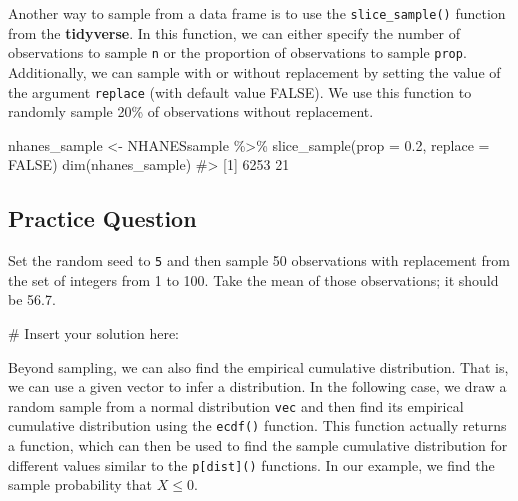 \documentclass[
  letterpaper,
]{latex/krantz}
\makeatletter
\newenvironment{Shaded}{\begin{snugshade}}{\end{snugshade}}
\newcommand{\AttributeTok}[1]{\textcolor[rgb]{0.40,0.45,0.13}{#1}}
\newcommand{\CommentTok}[1]{\textcolor[rgb]{0.37,0.37,0.37}{#1}}
\newcommand{\ConstantTok}[1]{\textcolor[rgb]{0.56,0.35,0.01}{#1}}
\newcommand{\FloatTok}[1]{\textcolor[rgb]{0.68,0.00,0.00}{#1}}
\newcommand{\FunctionTok}[1]{\textcolor[rgb]{0.28,0.35,0.67}{#1}}
\newcommand{\NormalTok}[1]{\textcolor[rgb]{0.00,0.23,0.31}{#1}}
\newcommand{\OtherTok}[1]{\textcolor[rgb]{0.00,0.23,0.31}{#1}}
\newcommand{\SpecialCharTok}[1]{\textcolor[rgb]{0.37,0.37,0.37}{#1}}
\newenvironment{kframe}{%
\medskip{}
\setlength{\fboxsep}{.8em}
 \def\at@end@of@kframe{}%
 \ifinner\ifhmode%
  \def\at@end@of@kframe{\end{minipage}}%
  \begin{minipage}{\columnwidth}%
 \fi\fi%
 \def\FrameCommand##1{\hskip\@totalleftmargin \hskip-\fboxsep
 \colorbox{shadecolor}{##1}\hskip-\fboxsep
     \hskip-\linewidth \hskip-\@totalleftmargin \hskip\columnwidth}%
 \MakeFramed {\advance\hsize-\width
   \@totalleftmargin\z@ \linewidth\hsize
   \@setminipage}}%
 {\par\unskip\endMakeFramed%
 \at@end@of@kframe}
\renewenvironment{Shaded}{\begin{kframe}}{\end{kframe}}
\makeatother
\begin{document}
Another way to sample from a data frame is to use the
\texttt{slice\_sample()}
function from the \textbf{tidyverse}. In this function, we can either
specify the number of observations to sample \texttt{n} or the
proportion of observations to sample \texttt{prop}. Additionally, we can
sample with or without replacement by setting the value of the argument
\texttt{replace} (with default value FALSE). We use this function to
randomly sample 20\% of observations without replacement.

\begin{Shaded}
\begin{Highlighting}[]
\NormalTok{nhanes\_sample }\OtherTok{\textless{}{-}}\NormalTok{ NHANESsample }\SpecialCharTok{\%\textgreater{}\%}
  \FunctionTok{slice\_sample}\NormalTok{(}\AttributeTok{prop =} \FloatTok{0.2}\NormalTok{, }\AttributeTok{replace =} \ConstantTok{FALSE}\NormalTok{)}
\FunctionTok{dim}\NormalTok{(nhanes\_sample)}
\CommentTok{\#\textgreater{} [1] 6253   21}
\end{Highlighting}
\end{Shaded}

\subsection{Practice Question}\label{practice-question-16}

Set the random seed to \texttt{5} and then sample 50 observations with
replacement from the set of integers from 1 to 100. Take the mean of
those observations; it should be 56.7.

\begin{Shaded}
\begin{Highlighting}[]
\CommentTok{\# Insert your solution here:}
\end{Highlighting}
\end{Shaded}

Beyond sampling, we can also find the empirical cumulative
distribution.
That is, we can use a given vector to infer a distribution. In the
following case, we draw a random sample from a normal distribution
\texttt{vec} and then find its empirical cumulative distribution using
the \texttt{ecdf()} function.
This function actually returns a function, which can then be used to
find the sample cumulative distribution for different values similar to
the \texttt{p{[}dist{]}()} functions. In our example, we find the sample
probability that \(X \leq 0\).
\end{document}
